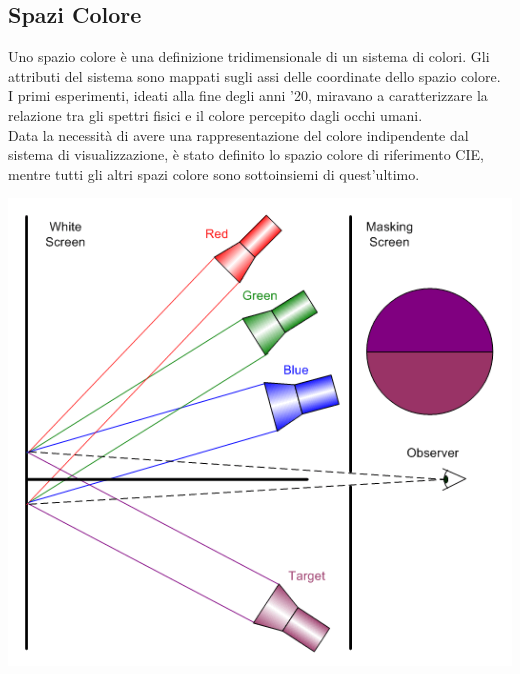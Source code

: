 \documentclass[a4paper,11pt]{article} %
\begin{document}
\subsection{Spazi Colore}
\begin{minipage}{0.65\textwidth}
    Uno spazio colore è una definizione tridimensionale di un sistema di colori. Gli attributi del sistema sono mappati sugli assi delle coordinate dello spazio colore. \\
    I primi esperimenti, ideati alla fine degli anni '20, miravano a caratterizzare la relazione tra gli spettri fisici e il colore percepito dagli occhi umani. \\
    Data la necessità di avere una rappresentazione del colore indipendente dal sistema di visualizzazione, è stato definito lo spazio colore di riferimento CIE, mentre tutti gli altri spazi colore sono sottoinsiemi di quest'ultimo.
\end{minipage}
\begin{minipage}{0.05\textwidth}
\end{minipage}
\begin{minipage}{0.3\textwidth}
    \includegraphics[width=\linewidth]{ColorMatchingExperiment}
\end{minipage}
\end{document}

